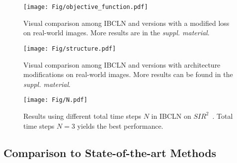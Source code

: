 \documentclass[10pt,twocolumn,letterpaper]{article}
\begin{document}
\begin{figure*}[h]
    \begin{center}
        \texttt{[image: Fig/objective\_function.pdf]}
    \end{center}
    \vspace{-1em}
    \caption{Visual comparison among IBCLN and versions with a modified loss on real-world images. More results are in the \textit{suppl. material}.}
    \vspace{-0.8em}
    \label{fig:objective_function}
\end{figure*}

\begin{figure}[h]
    \begin{center}
        \texttt{[image: Fig/structure.pdf]}
    \end{center}
    \vspace{-0.8em}
    \caption{Visual comparison among IBCLN and versions with architecture modifications on real-world images. More results can be found in the \textit{suppl. material}. 
    }
    \vspace{-1em}
    \label{fig:architecture}
\end{figure}



\begin{figure}[h]
    \vspace{-1em}
    \begin{center}
        \texttt{[image: Fig/N.pdf]}
    \end{center}
    \vspace{-1.2em}
    \caption{Results using different total time steps $N$ in IBCLN on $SIR^2$~\cite{wan2017benchmarking}. Total time steps $N = 3$ yields the best performance.
    }
    \vspace{-0.5em}
    \label{fig:N}
\end{figure}

\vspace{-0.2em}
\subsection{Comparison to State-of-the-art Methods}
\end{document}
